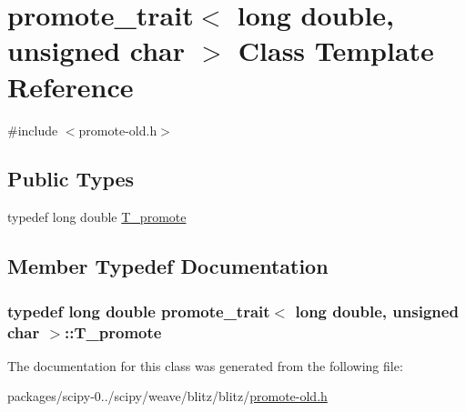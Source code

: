 \hypertarget{classpromote__trait_3_01long_01double_00_01unsigned_01char_01_4}{}\section{promote\+\_\+trait$<$ long double, unsigned char $>$ Class Template Reference}
\label{classpromote__trait_3_01long_01double_00_01unsigned_01char_01_4}


{\ttfamily \#include $<$promote-\/old.\+h$>$}

\subsection*{Public Types}
\begin{DoxyCompactItemize}
\item 
typedef long double \hyperlink{classpromote__trait_3_01long_01double_00_01unsigned_01char_01_4_aad0e315944f37e7d14d5e3172daea1cc}{T\+\_\+promote}
\end{DoxyCompactItemize}


\subsection{Member Typedef Documentation}
\hypertarget{classpromote__trait_3_01long_01double_00_01unsigned_01char_01_4_aad0e315944f37e7d14d5e3172daea1cc}{}
\subsubsection[{T\+\_\+promote}]{\setlength{\rightskip}{0pt plus 5cm}typedef long double {\bf promote\+\_\+trait}$<$ long double, unsigned char $>$\+::{\bf T\+\_\+promote}}\label{classpromote__trait_3_01long_01double_00_01unsigned_01char_01_4_aad0e315944f37e7d14d5e3172daea1cc}


The documentation for this class was generated from the following file\+:\begin{DoxyCompactItemize}
\item 
packages/scipy-\/0../scipy/weave/blitz/blitz/\hyperlink{promote-old_8h}{promote-\/old.\+h}\end{DoxyCompactItemize}
